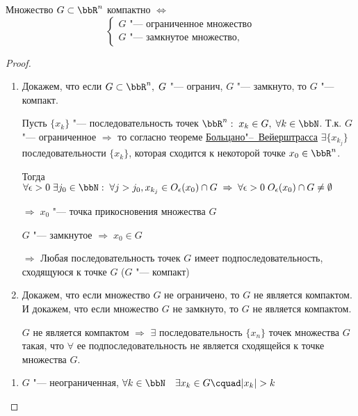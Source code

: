 \begin{thm}
Множество $G \subset \bbR^n$ компактно $\Leftrightarrow$
\begin{equation}
\begin{cases}
G \textit{ "--- ограниченное множество} \\
G \textit{ "--- замкнутое множество},
\end{cases}
\end{equation}
\end{thm}

\begin{proof}\leavevmode
\begin{enumerate}[wide, labelwidth=!, labelindent=\parindent]
\item
Докажем, что если $G \subset \bbR^n, \; G$ "--- огранич, $G$ "--- замкнуто, то $G$ "--- компакт.

Пусть $\{ x_k \}$ "--- последовательность точек $\bbR^n: \; x_k \in G, \; \forall k \in \bbN$. Т.к. $G$ "--- ограниченное $\Rightarrow$ то согласно теореме \hyperref[ch1:th:TBV]{Больцано"--~Вейерштрасса} $\exists \{ x_{k_j} \}$ последовательности $\{ x_k \}$, которая сходится к некоторой точке $x_0 \in \bbR^n$.

Тогда $\forall \epsilon > 0 \; \exists j_0 \in \bbN: \; \forall j > j_0, x_{k_j} \in O_\epsilon(x_0) \cap G \; \Rightarrow \; \forall \epsilon > 0 \; O_\epsilon(x_0) \cap G \not= \emptyset$

$\Rightarrow \; x_0$ "--- точка прикосновения множества $G$

$G$ "--- замкнутое $\Rightarrow \; x_0 \in G$

$\Rightarrow$ Любая последовательность точек $G$ имеет подпоследовательность, сходящуюся к точке $G$ ($G$ "--- компакт)

\item

Докажем, что если множество $G$ не ограничено, то $G$ не является компактом. И докажем, что если множество $G$ не замкнуто, то $G$ не является компактом.

$G$ не является компактом $\Rightarrow$ $\exists$ последовательность $\{ x_n \}$ точек множества $G$ такая, что $\forall$ ее подпоследовательность не является сходящейся к точке множества $G$. 
\end{enumerate}

\begin{enumerate}[wide, labelwidth=!, labelindent=\parindent]
\item

$G$ "--- неограниченная, $\forall k \in \bbN \quad \exists x_k \in G\cquad |x_k| > k$


\end{enumerate}
\end{proof}

